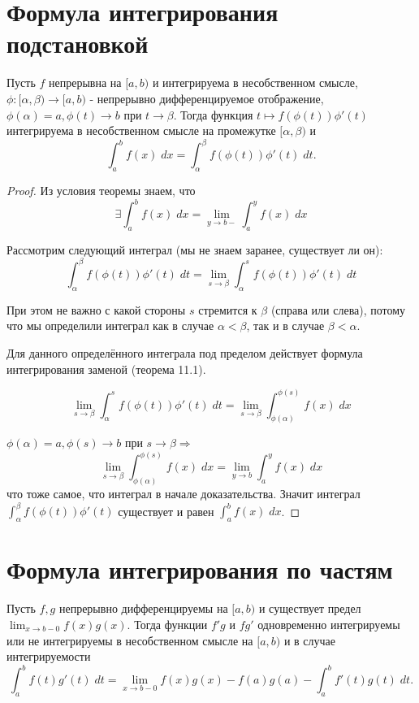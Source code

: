 	\section{Формула интегрирования подстановкой}
	
	\begin{theorem}
		Пусть $f$ непрерывна на $[a, b)$ и интегрируема в несобственном смысле, $\phi: [\alpha, \beta) \rightarrow [a, b)$ - непрерывно дифференцируемое отображение, $\phi(\alpha) = a, \phi(t) \rightarrow b$ при $t \rightarrow \beta$. Тогда функция $t \mapsto f(\phi(t))\phi'(t)$ интегрируема в несобственном смысле на промежутке $[\alpha, \beta)$ и
		\[ \int_a^b f(x) \; dx = \int_{\alpha}^{\beta} f(\phi(t))\phi'(t) \; dt. \]
	\end{theorem}
	
	\begin{proof}
		Из условия теоремы знаем, что
		\[ \exists \int_a^b f(x) \; dx = \lim_{y \to b-} \int_a^y f(x) \; dx\]
		
		Рассмотрим следующий интеграл (мы не знаем заранее, существует ли он):
		\[ \int_{\alpha}^{\beta} f(\phi(t)) \phi'(t)\; dt = \lim_{s \to \beta} \int_{\alpha}^s f(\phi(t))\phi'(t) \; dt \]
		
		При этом не важно с какой стороны $s$ стремится к $\beta$ (справа или слева), потому что мы определили интеграл как в случае $\alpha < \beta$, так и в случае $\beta < \alpha$.
		
		Для данного определённого интеграла под пределом действует формула интегрирования заменой (теорема 11.1).
		
		\[ \lim_{s \to \beta} \int_{\alpha}^s f(\phi(t))\phi'(t) \; dt = \lim_{s \to \beta} \int_{\phi(\alpha)}^{\phi(s)} f(x) \; dx \]
		
		$\phi(\alpha) = a, \phi(s) \to b$ при $s \to \beta \Rightarrow$
		\[ \lim_{s \to \beta} \int_{\phi(\alpha)}^{\phi(s)} f(x) \; dx = \lim_{y \to b} \int_a^y f(x) \; dx \]
		что тоже самое, что интеграл в начале доказательства. Значит интеграл $\int_{\alpha}^{\beta} f(\phi(t)) \phi'(t)$ существует и равен $\int_a^b f(x) \; dx$.
	\end{proof}
	
	\section{Формула интегрирования по частям}
	
	\begin{theorem}
		Пусть $f, g$ непрерывно дифференцируемы на $[a, b)$ и существует предел $\displaystyle\lim_{x \to b - 0} f(x)g(x)$. Тогда функции $f'g$ и $fg'$ одновременно интегрируемы или не интегрируемы в несобственном смысле на $[a, b)$ и в случае интегрируемости
		\[ \int_a^b f(t)g'(t) \; dt = \lim_{x \to b - 0} f(x)g(x) - f(a)g(a) - \int_a^b f'(t)g(t) \; dt. \]
	\end{theorem}
	
